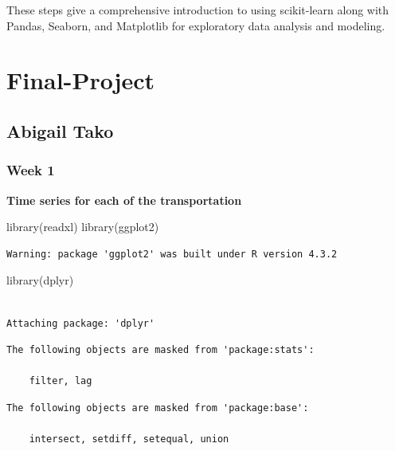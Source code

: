 \documentclass[
  letterpaper,
  DIV=11,
  numbers=noendperiod]{scrreprt}
\newenvironment{Shaded}{\begin{snugshade}}{\end{snugshade}}
\newcommand{\FunctionTok}[1]{\textcolor[rgb]{0.28,0.35,0.67}{#1}}
\newcommand{\NormalTok}[1]{\textcolor[rgb]{0.00,0.23,0.31}{#1}}
\begin{document}
These steps give a comprehensive introduction to using scikit-learn
along with Pandas, Seaborn, and Matplotlib for exploratory data analysis
and modeling.

\part{Final-Project}

\chapter{Abigail Tako}\label{abigail-tako-1}

\section{Week 1}\label{week-1-9}

\textbf{Time series for each of the transportation}

\begin{Shaded}
\begin{Highlighting}[]
\FunctionTok{library}\NormalTok{(readxl)}
\FunctionTok{library}\NormalTok{(ggplot2)}
\end{Highlighting}
\end{Shaded}

\begin{verbatim}
Warning: package 'ggplot2' was built under R version 4.3.2
\end{verbatim}

\begin{Shaded}
\begin{Highlighting}[]
\FunctionTok{library}\NormalTok{(dplyr)}
\end{Highlighting}
\end{Shaded}

\begin{verbatim}

Attaching package: 'dplyr'
\end{verbatim}

\begin{verbatim}
The following objects are masked from 'package:stats':

    filter, lag
\end{verbatim}

\begin{verbatim}
The following objects are masked from 'package:base':

    intersect, setdiff, setequal, union
\end{verbatim}
\end{document}

